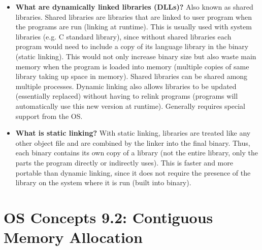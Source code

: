 \documentclass[12pt]{article}
\begin{document}
\begin{itemize}
    \item \textbf{What are dynamically linked libraries (DLLs)?} Also known as shared libraries. Shared libraries are libraries that are linked to user program when the programs are run (linking at runtime). This is usually used with system libraries (e.g. C standard library), since without shared libraries each program would need to include a copy of its language library in the binary (static linking). This would not only increase binary size but also waste main memory when the program is loaded into memory (multiple copies of same library taking up space in memory). Shared libraries can be shared among multiple processes. Dynamic linking also allows libraries to be updated (essentially replaced) without having to relink programs (programs will automatically use this new version at runtime). Generally requires special support from the OS.
    \item \textbf{What is static linking?} With static linking, libraries are treated like any other object file and are combined by the linker into the final binary. Thus, each binary contains its own copy of a library (not the entire library, only the parts the program directly or indirectly uses). This is faster and more portable than dynamic linking, since it does not require the presence of the library on the system where it is run (built into binary).
\end{itemize}

\section*{OS Concepts 9.2: Contiguous Memory Allocation}
\end{document}
